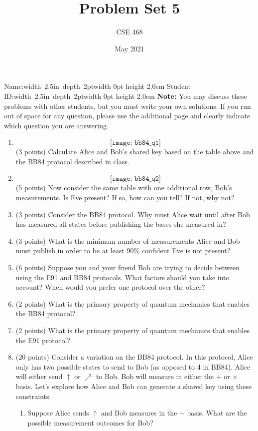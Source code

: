 \documentclass[12pt]{article}
\title{Problem Set 5}
\author{CSE 468}
\date{May 2021}
\newcommand{\NameBlank}{\mbox{\hskip 4pt\vrule width 2.5in depth 2pt}\vrule width 0pt height 2.0em}
\begin{document}
\maketitle

\noindent Name:\NameBlank{} \newline
\noindent Student ID:\NameBlank{} \newline
\textbf{Note:} You may discuss these problems with other students, but you must write your own solutions. If you run out of space for any question, please use the additional page and clearly indicate which question you are answering.

\begin{enumerate}[font=\bfseries]
    \item \[\texttt{[image: bb84\_q1]}\]
    (3 points) Calculate Alice and Bob's shared key based on the table above and the BB84 protocol described in class.
    \item \[\texttt{[image: bb84\_q2]}\]
    (5 points) Now consider the same table with one additional row, Bob's measurements. Is Eve present? If so, how can you tell? If not, why not?
    \item (3 points) Consider the BB84 protocol. Why must Alice wait until after Bob has measured all states before publishing the bases she measured in?
    \item (3 points) What is the minimum number of measurements Alice and Bob must publish in order to be at least 90\% confident Eve is not present?
    \item (6 points) Suppose you and your friend Bob are trying to decide between using the E91 and BB84 protocols. What factors should you take into account? When would you prefer one protocol over the other?
    \item (2 points) What is the primary property of quantum mechanics that enables the BB84 protocol?
    \item (2 points) What is the primary property of quantum mechanics that enables the E91 protocol?
    \item (20 points) Consider a variation on the BB84 protocol. In this protocol, Alice only has two possible states to send to Bob (as opposed to 4 in BB84). Alice will either send $\uparrow$ or $\nearrow$ to Bob. Bob will measure in either the $+$ or $\times$ basis. Let's explore how Alice and Bob can generate a shared key using these constraints.
        \begin{enumerate}
            \item Suppose Alice sends $\uparrow$ and Bob measures in the $+$ basis. What are the possible measurement outcomes for Bob?

\end{enumerate}
\end{enumerate}
\end{document}

